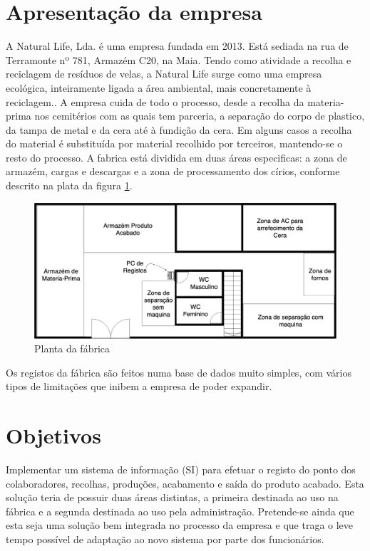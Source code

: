 \section{Apresentação da empresa}
A Natural Life, Lda. é uma empresa fundada em 2013. Está sediada na rua de Terramonte nº 781, Armazém C20, na Maia. Tendo como atividade a recolha e reciclagem de resíduos de velas, a Natural Life surge como uma empresa ecológica, inteiramente ligada a área ambiental, mais concretamente à reciclagem.\cite{NaturalLife}. A empresa cuida de todo o processo, desde a recolha da materia-prima nos cemitérios com as quais tem parceria, a separação do corpo de plastico, da tampa de metal e da cera até à fundição da cera. Em alguns casos a recolha do material é substituída por material recolhido por terceiros, mantendo-se o resto do processo. A fabrica está dividida em duas áreas especificas: a zona de armazém, cargas e descargas e a zona de processamento dos círios, conforme descrito na plata da figura \ref{fig:planta_naturallife}.
\begin{figure}[H] 
	\begin{center}
		\includegraphics[width=\textwidth,keepaspectratio]{figuras/PlantaNaturalLife.png}
		\caption{Planta da fábrica}\label{fig:planta_naturallife} 
	\end{center}
\end{figure}

\noindent
Os registos da fábrica são feitos numa base de dados muito simples, com vários tipos de limitações que inibem a empresa de poder expandir.

\section{Objetivos}
Implementar um sistema de informação (SI\label{sym:SI}) para efetuar o registo do ponto dos colaboradores, recolhas, produções, acabamento e saída do produto acabado. Esta solução teria de possuir duas áreas distintas, a primeira destinada ao uso na fábrica e a segunda destinada ao uso pela administração. Pretende-se ainda que esta seja uma solução bem integrada no processo da empresa e que traga o leve tempo possível de adaptação ao novo sistema por parte dos funcionários.

